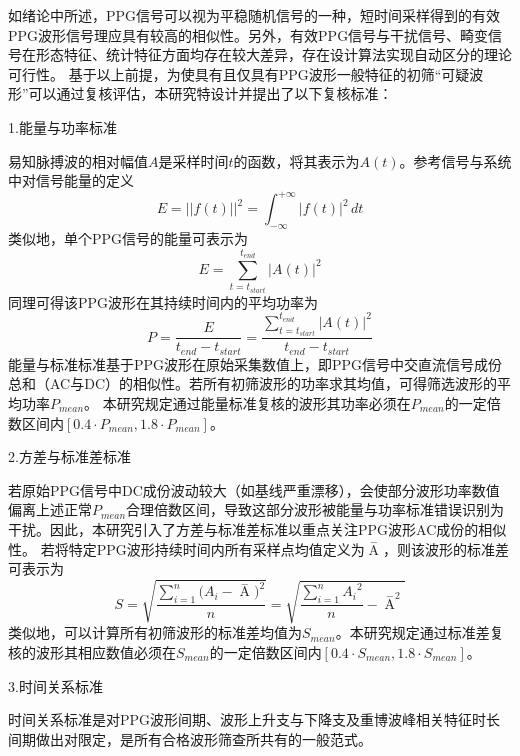 如绪论中所述，PPG信号可以视为平稳随机信号的一种，短时间采样得到的有效PPG波形信号理应具有较高的相似性\cite{Qiu2012}。另外，有效PPG信号与干扰信号、畸变信号在形态特征、统计特征方面均存在较大差异，存在设计算法实现自动区分的理论可行性。
基于以上前提，为使具有且仅具有PPG波形一般特征的初筛“可疑波形”可以通过复核评估，本研究特设计并提出了以下复核标准：

1.能量与功率标准

易知脉搏波的相对幅值$A$是采样时间$t$的函数，将其表示为$A(t)$。参考信号与系统中对信号能量的定义\cite{Alan2019}
\begin{equation}
    \label{equ:energy}
    E=||f(t)||^2=\int_{-\infty}^{+\infty}{|f(t)|^2}\,d t
\end{equation}
类似地，单个PPG信号的能量可表示为
\begin{equation}
    \label{equ:ppge}
    E=\sum_{t=t_{start}}^{t_{end}}|A(t)|^2
\end{equation}
同理可得该PPG波形在其持续时间内的平均功率为
\begin{equation}
    \label{equ:ppgp}
    P=\frac{E}{t_{end}-t_{start}}=\frac{\sum_{t=t_{start}}^{t_{end}}|A(t)|^2}{t_{end}-t_{start}}
\end{equation}
能量与标准标准基于PPG波形在原始采集数值上，即PPG信号中交直流信号成份总和（AC与DC）的相似性。若所有初筛波形的功率求其均值，可得筛选波形的平均功率$P_{mean}$。
本研究规定通过能量标准复核的波形其功率必须在$P_{mean}$的一定倍数区间内$[0.4 \cdot P_{mean},1.8 \cdot P_{mean}]$。

2.方差与标准差标准

若原始PPG信号中DC成份波动较大（如基线严重漂移），会使部分波形功率数值偏离上述正常$P_{mean}$合理倍数区间，导致这部分波形被能量与功率标准错误识别为干扰。因此，本研究引入了方差与标准差标准以重点关注PPG波形AC成份的相似性。
若将特定PPG波形持续时间内所有采样点均值定义为$\mathop{A} \limits^-$，则该波形的标准差可表示为
\begin{equation}
    \label{equ:ppgstd}
    S=\sqrt{\frac{\sum_{i=1}^{n}{(A_i-\mathop{A} \limits^-})^2}{n}}=\sqrt{\frac{\sum_{i=1}^n{A_i}^2}{n}-{\mathop{A} \limits^-}^2}
\end{equation}
类似地，可以计算所有初筛波形的标准差均值为$S_{mean}$。本研究规定通过标准差复核的波形其相应数值必须在$S_{mean}$的一定倍数区间内$[0.4 \cdot S_{mean},1.8 \cdot S_{mean}]$。

3.时间关系标准

时间关系标准是对PPG波形间期、波形上升支与下降支及重博波峰相关特征时长间期做出对限定，是所有合格波形筛查所共有的一般范式。

